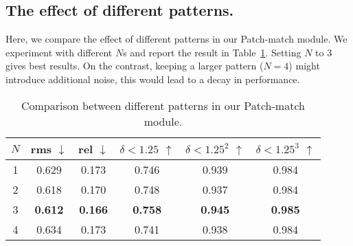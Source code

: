 \documentclass[runningheads]{llncs}
\begin{document}
\begin{appendix}
\section{The effect of different patterns.} 
Here, we compare the effect of different patterns in our Patch-match module. We experiment with different $N$s and report the result in Table~\ref{tab:diffpattern}. Setting $N$ to 3 gives best results. On the contrast, keeping a larger pattern ($N=4$) might introduce additional noise, this would lead to a decay in performance.
\begin{table}[!h] \begin{center}
        \begin{tabular}{c|cc|ccc}
            \toprule[1pt]
            $N$  & rms $\downarrow$ &  rel $\downarrow$ & $ \delta < 1.25$ $\uparrow$  & $ \delta < 1.25^2$ $\uparrow$  & $ \delta < 1.25^3$ $\uparrow$ \\ \hline
            1 & 0.629 & 0.173 & 0.746 & 0.939 & 0.984  \\
            2 & 0.618 & 0.170 & 0.748 & 0.937 & 0.984 \\
            3 & \textbf{0.612} & \textbf{0.166} & \textbf{0.758} & \textbf{0.945} & \textbf{0.985} \\
            4 & 0.634 & 0.173 & 0.741 & 0.938 & 0.984 \\
            \toprule[1pt]
        \end{tabular}
    \end{center}
    \caption{Comparison between different patterns in our Patch-match module.}
    \label{tab:diffpattern}
\end{table}
\end{appendix}
\clearpage



\end{document}
